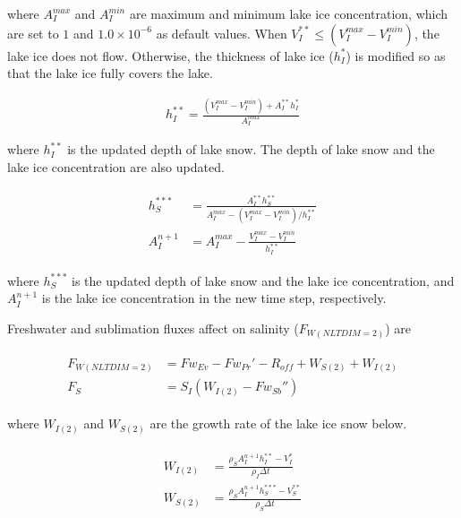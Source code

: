 where \(A_I^{max}\) and \(A_I^{min}\) are maximum and minimum lake ice concentration, which are set to \(1\) and \(1.0\times 10^{-6}\) as default values. When
\(V_I^{\ast\ast} \le (V_I^{max}-V_I^{min})\), the lake ice does not flow. Otherwise, the thickness of lake ice (\(h_I^{\ast}\)) is modified so as that the lake ice fully covers the lake.

\begin{eqnarray}
  h_I^{\ast\ast} = \frac{(V_I^{max}-V_I^{min})+A_I^{\ast\ast}h_I^{\ast}}{A_I^{max}}
\end{eqnarray}

where \(h_I^{\ast\ast}\) is the updated depth of lake snow. The depth of lake snow and the lake ice concentration are also updated.

\begin{eqnarray}
\begin{array}{rl}
  h_S^{\ast\ast\ast} &= \frac{A_I^{\ast\ast}h_S^{\ast\ast}}{A_I^{max}-(V_I^{max}-V_I^{min})/h_I^{\ast\ast}}\\
  A_I^{n+1} &= A_I^{max} - \frac{V_I^{max}-V_I^{min}}{h_I^{\ast\ast}}
\end{array}
\end{eqnarray}

where \(h_S^{\ast\ast\ast}\) is the updated depth of lake snow and the lake ice concentration, and \(A_I^{n+1}\) is the lake ice concentration in the new time step, respectively.

Freshwater and sublimation fluxes affect on salinity (\(F_{W(NLTDIM=2)}\)) are

\begin{eqnarray}
\begin{array}{rl}
    F_{W(NLTDIM=2)} &=Fw_{Ev} - Fw_{Pr}' - R_{off} + W_{S(2)} + W_{I(2)} \\
    F_S &= S_I(W_{I(2)}-Fw_{Sb}'')
\end{array}
\end{eqnarray}

where \(W_{I(2)}\) and \(W_{S(2)}\) are the growth rate of the lake ice snow below.

\begin{eqnarray}
\begin{array}{rl}
    W_{I(2)} &= \frac{\rho_S A_I^{n+1} h_I^{\ast\ast} - V_I^{\ast}}{\rho_I \Delta t}\\
    W_{S(2)} &=  \frac{\rho_S A_I^{n+1} h_S^{\ast\ast\ast} - V_S^{\ast\ast}}{\rho_S \Delta t}
\end{array}
\end{eqnarray}

